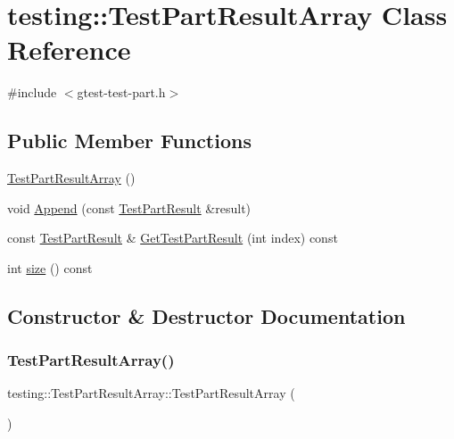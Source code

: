 \hypertarget{classtesting_1_1_test_part_result_array}{}\section{testing\+::Test\+Part\+Result\+Array Class Reference}
\label{classtesting_1_1_test_part_result_array}


{\ttfamily \#include $<$gtest-\/test-\/part.\+h$>$}

\subsection*{Public Member Functions}
\begin{DoxyCompactItemize}
\item 
\mbox{\hyperlink{classtesting_1_1_test_part_result_array_ac9bfc830989c5328d7ff2ba8fa3c072b}{Test\+Part\+Result\+Array}} ()
\item 
void \mbox{\hyperlink{classtesting_1_1_test_part_result_array_a01844bd505b18a666324617a1b459558}{Append}} (const \mbox{\hyperlink{classtesting_1_1_test_part_result}{Test\+Part\+Result}} \&result)
\item 
const \mbox{\hyperlink{classtesting_1_1_test_part_result}{Test\+Part\+Result}} \& \mbox{\hyperlink{classtesting_1_1_test_part_result_array_ad5f97a52a36f120fa08fa9638901740e}{Get\+Test\+Part\+Result}} (int index) const
\item 
int \mbox{\hyperlink{classtesting_1_1_test_part_result_array_a31555f11ba42b81ddad0a26a87710d0a}{size}} () const
\end{DoxyCompactItemize}


\subsection{Constructor \& Destructor Documentation}
\mbox{\label{classtesting_1_1_test_part_result_array_ac9bfc830989c5328d7ff2ba8fa3c072b}} 
\subsubsection{\texorpdfstring{TestPartResultArray()}{TestPartResultArray()}}
{\footnotesize\ttfamily testing\+::\+Test\+Part\+Result\+Array\+::\+Test\+Part\+Result\+Array (\begin{DoxyParamCaption}{ }\end{DoxyParamCaption})\hspace{0.3cm}{\ttfamily [inline]}}



